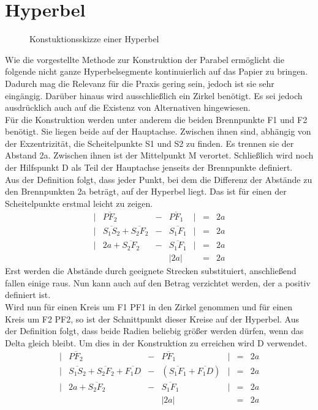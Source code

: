\section{Hyperbel}
\begin{figure}[h]
	\centering
		\resizebox{.5\linewidth}{!}{
			
		}
	\caption{Konstuktionsskizze einer Hyperbel}
\end{figure}
Wie die vorgestellte Methode zur Konstruktion der Parabel ermöglicht die folgende nicht ganze Hyperbelsegmente kontinuierlich auf das Papier zu bringen. Dadurch mag die Relevanz für die Praxis gering sein, jedoch ist sie sehr eingängig. Darüber hinaus wird ausschließlich ein Zirkel benötigt. Es sei jedoch ausdrücklich auch auf die Existenz von Alternativen hingewiesen.\\
Für die Konstruktion werden unter anderem die beiden Brennpunkte F1 und F2 benötigt. Sie liegen beide auf der Hauptachse. Zwischen ihnen sind, abhängig von der Exzentrizität, die Scheitelpunkte S1 und S2 zu finden. Es trennen sie der Abstand 2a. Zwischen ihnen ist der Mittelpunkt M verortet. Schließlich wird noch der Hilfspunkt D als Teil der Hauptachse jenseits der Brennpunkte definiert.\\
Aus der Definition folgt, dass jeder Punkt, bei dem die Differenz der Abstände zu den Brennpunkten 2a beträgt, auf der Hyperbel liegt. Das ist für einen der Scheitelpunkte erstmal leicht zu zeigen.
\begin{displaymath}
	\begin{array}{lcccrcl}
		|&\overline{{PF}_2} & - & \overline{{PF}_1}&| & = & 2a\\
		|&\overline{{S}_1{S}_2}+\overline{{S}_2{F}_2} & - & \overline{{S}_1{F}_1}&| & = & 2a\\
		|&2a+\overline{{S}_2{F}_2} & - & \overline{{S}_1{F}_1}&| & = & 2a\\
		&&&|2a| && = & 2a
	\end{array}
\end{displaymath}
Erst werden die Abstände durch geeignete Strecken substituiert, anschließend fallen einige raus. Nun kann auch auf den Betrag verzichtet werden, der a positiv definiert ist.\\
Wird nun für einen Kreis um F1 PF1 in den Zirkel genommen und für einen Kreis um F2 PF2, so ist der Schnittpunkt dieser Kreise auf der Hyperbel. Aus der Definition folgt, dass beide Radien beliebig größer werden dürfen, wenn das Delta gleich bleibt. Um dies in der Konstruktion zu erreichen wird D verwendet.
\begin{displaymath}
	\begin{array}{lcccrcl}
		|&\overline{{PF}_2} & - & \overline{{PF}_1}&| & = & 2a\\
		|&\overline{{S}_1{S}_2}+\overline{{S}_2{F}_2}+\overline{{F}_1{D}} & - & (\overline{{S}_1{F}_1}+\overline{{F}_1{D}})&| & = & 2a\\
		|&2a+\overline{{S}_2{F}_2} & - & \overline{{S}_1{F}_1}&| & = & 2a\\
		&&&|2a| && = & 2a
	\end{array}
\end{displaymath}
